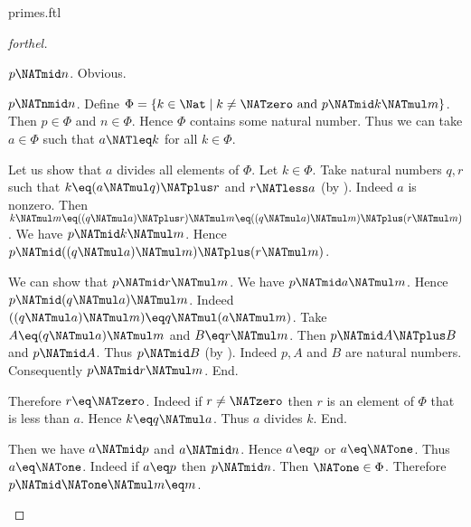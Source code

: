 \documentclass{naproche-library}
\begin{document}
\begin{smodule}[title=Prime Numbers]{primes.ftl}
\begin{proof}[forthel]
  \begin{case}{$p \NATmid n$.}
    Obvious.
  \end{case}

  \begin{case}{$p \NATnmid n$.}
    Define $\Phi = \{ k \in \Nat \mid k \neq \NATzero\text{ and }p \NATmid k \NATmul m \}$.
    Then $p \in \Phi$ and $n \in \Phi$.
    Hence $\Phi$ contains some natural number.
    Thus we can take $a \in \Phi$ such that $a \NATleq k$ for all $k \in \Phi$.

    Let us show that $a$ divides all elements of $\Phi$.
      Let $k \in \Phi$.
      Take natural numbers $q, r$ such that $k \eq (a \NATmul q) \NATplus r$ and $r \NATless a$ (by ).
      Indeed $a$ is nonzero.
      Then $k \NATmul m
        \eq ((q \NATmul a) \NATplus r) \NATmul m
        \eq ((q \NATmul a) \NATmul m) \NATplus (r \NATmul m)$.
      We have $p \NATmid k \NATmul m$.
      Hence $p \NATmid ((q \NATmul a) \NATmul m) \NATplus (r \NATmul m)$.

      We can show that $p \NATmid r \NATmul m$.
        We have $p \NATmid a \NATmul m$.
        Hence $p \NATmid (q \NATmul a) \NATmul m$.
        Indeed $((q \NATmul a) \NATmul m) \eq q \NATmul (a \NATmul m)$. %
        Take $A \eq (q \NATmul a) \NATmul m$ and $B \eq r \NATmul m$. %
        Then $p \NATmid A \NATplus B$ and $p \NATmid A$.
        Thus $p \NATmid B$ (by ).
        Indeed $p, A$ and $B$ are natural numbers.
        Consequently $p \NATmid r \NATmul m$.
      End.

      Therefore $r \eq \NATzero$.
      Indeed if $r \neq \NATzero$ then $r$ is an element of $\Phi$ that is less than $a$.
      Hence $k \eq q \NATmul a$.
      Thus $a$ divides $k$.
    End.

    Then we have $a \NATmid p$ and $a \NATmid n$.
    Hence $a \eq p$ or $a \eq \NATone$.
    Thus $a \eq \NATone$.
    Indeed if $a \eq p$ then $p \NATmid n$.
    Then $\NATone \in \Phi$.
    Therefore $p \NATmid \NATone \NATmul m \eq m$.
  \end{case}
\end{proof}
\end{smodule}
\end{document}
